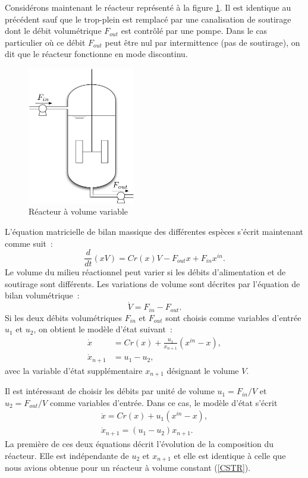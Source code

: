 Considérons maintenant le réacteur représenté à la figure \ref{Fig:CSTR2}. Il est
identique au précédent sauf que le trop-plein est remplacé par une canalisation
de soutirage dont le débit volumétrique $F_{out}$ est contrôlé par
une pompe. Dans le cas particulier où ce débit $F_{out}$ peut être nul par
intermittence (pas de soutirage), on dit que le réacteur fonctionne en mode
discontinu.
\begin{figure}[htbp] 
   \centering
   \includegraphics[height=6cm]{CSTR2} 
   \caption{Réacteur à volume variable}
   \label{Fig:CSTR2}
\end{figure}
L'équation matricielle de bilan massique des différentes espèces s'écrit
maintenant comme suit~:
$$
\frac{d}{dt} (xV) = Cr(x)V - F_{out}x + F_{in}x^{in}.
$$
Le volume du milieu réactionnel peut varier si les débits d'alimentation et de
soutirage sont différents. Les variations de volume sont décrites par l'équation de
bilan volumétrique~:
$$
\dot V = F_{in} -F_{out}.
$$
Si les deux débits volumétriques $F_{in}$ et $F_{out}$ sont
choisis comme variables d'entrée $u_1$ et $u_2$, on obtient le modèle d'état
suivant~: 
\begin{equation*} \begin{split}
\dot x &= Cr(x) + \frac{u_1}{x_{n+1}} (x^{in} - x), \\
\dot x_{n+1} &= u_1 - u_2,
\end{split} \end{equation*}
avec la variable d'état supplémentaire $x_{n+1}$ désignant le volume $V$.

Il est intéressant de choisir les débits par unité de volume $u_1 =
F_{in}/V$ et $u_2 = F_{out}/V$ comme variables d'entrée. Dans ce cas, le modèle
d'état s'écrit
\begin{equation*} \begin{split}
\dot x = Cr(x) + u_1(x^{in} - x), \\
\dot x_{n+1}= (u_1 - u_2)x_{n+1}.
\end{split} \end{equation*}
La première de ces deux équations décrit l'évolution de la
composition du réacteur. Elle est indépendante de $u_2$ et $x_{n+1}$ et elle est
identique à celle que nous avions obtenue pour un réacteur à volume constant
(\ref{CSTR}). 

